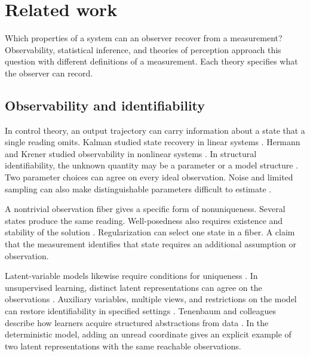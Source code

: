 \section{Related work}
\label{sec:relatedwork}

Which properties of a system can an observer recover from a measurement? Observability, statistical inference, and theories of perception approach this question with different definitions of a measurement. Each theory specifies what the observer can record.

\subsection{Observability and identifiability}

In control theory, an output trajectory can carry information about a state that a single reading omits. Kalman studied state recovery in linear systems \parencite{Kalman1963}. Hermann and Krener studied observability in nonlinear systems \parencite{HermannKrener1977}. In structural identifiability, the unknown quantity may be a parameter or a model structure \parencite{BellmanAstrom1970,Rothenberg1971,WalterPronzato1997}. Two parameter choices can agree on every ideal observation. Noise and limited sampling can also make distinguishable parameters difficult to estimate \parencite{Calderon1980,Raue2009,Chis2011,Villaverde2016,Meshkat2009,Guillaume2019}.

A nontrivial observation fiber gives a specific form of nonuniqueness. Several states produce the same reading. Well-posedness also requires existence and stability of the solution \parencite{Hadamard1923,Tikhonov1963,Engl1996}. Regularization can select one state in a fiber. A claim that the measurement identifies that state requires an additional assumption or observation.

Latent-variable models likewise require conditions for uniqueness \parencite{Teicher1963,Kruskal1977,Allman2009,Anandkumar2014}. In unsupervised learning, distinct latent representations can agree on the observations \parencite{Locatello2019}. Auxiliary variables, multiple views, and restrictions on the model can restore identifiability in specified settings \parencite{Hyvarinen2019,Khemakhem2020,Gresele2020,XiBloemReddy2023}. Tenenbaum and colleagues describe how learners acquire structured abstractions from data \parencite{Tenenbaum2011}. In the deterministic model, adding an unread coordinate gives an explicit example of two latent representations with the same reachable observations.

